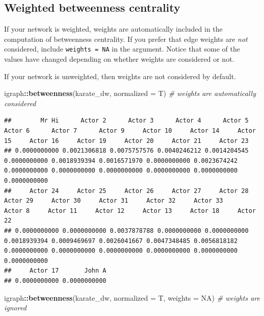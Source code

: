 \documentclass[
]{book}
\newenvironment{Shaded}{\begin{snugshade}}{\end{snugshade}}
\newcommand{\AttributeTok}[1]{\textcolor[rgb]{0.13,0.29,0.53}{#1}}
\newcommand{\CommentTok}[1]{\textcolor[rgb]{0.56,0.35,0.01}{\textit{#1}}}
\newcommand{\ConstantTok}[1]{\textcolor[rgb]{0.56,0.35,0.01}{#1}}
\newcommand{\FunctionTok}[1]{\textcolor[rgb]{0.13,0.29,0.53}{\textbf{#1}}}
\newcommand{\NormalTok}[1]{#1}
\newcommand{\SpecialCharTok}[1]{\textcolor[rgb]{0.81,0.36,0.00}{\textbf{#1}}}
\begin{document}
\subsection{Weighted betweenness centrality}\label{weighted-betweenness-centrality}

If your network is weighted, weights are automatically included in the computation of betweenness centrality. If you prefer that edge weights are \emph{not} considered, include \texttt{weights\ =\ NA} in the argument. Notice that some of the values have changed depending on whether weights are considered or not.

If your network is unweighted, then weights are not considered by default.

\begin{Shaded}
\begin{Highlighting}[]
\NormalTok{igraph}\SpecialCharTok{::}\FunctionTok{betweenness}\NormalTok{(karate\_dw, }\AttributeTok{normalized =}\NormalTok{ T) }\CommentTok{\# weights are automatically considered}
\end{Highlighting}
\end{Shaded}

\begin{verbatim}
##        Mr Hi      Actor 2      Actor 3      Actor 4      Actor 5      Actor 6      Actor 7      Actor 9     Actor 10     Actor 14     Actor 15     Actor 16     Actor 19     Actor 20     Actor 21     Actor 23 
## 0.0000000000 0.0021306818 0.0075757576 0.0040246212 0.0014204545 0.0000000000 0.0018939394 0.0016571970 0.0000000000 0.0023674242 0.0000000000 0.0000000000 0.0000000000 0.0000000000 0.0000000000 0.0000000000 
##     Actor 24     Actor 25     Actor 26     Actor 27     Actor 28     Actor 29     Actor 30     Actor 31     Actor 32     Actor 33      Actor 8     Actor 11     Actor 12     Actor 13     Actor 18     Actor 22 
## 0.0000000000 0.0000000000 0.0037878788 0.0000000000 0.0000000000 0.0018939394 0.0009469697 0.0026041667 0.0047348485 0.0056818182 0.0000000000 0.0000000000 0.0000000000 0.0000000000 0.0000000000 0.0000000000 
##     Actor 17       John A 
## 0.0000000000 0.0000000000
\end{verbatim}

\begin{Shaded}
\begin{Highlighting}[]
\NormalTok{igraph}\SpecialCharTok{::}\FunctionTok{betweenness}\NormalTok{(karate\_dw, }\AttributeTok{normalized =}\NormalTok{ T, }\AttributeTok{weights =} \ConstantTok{NA}\NormalTok{) }\CommentTok{\# weights are ignored}
\end{Highlighting}
\end{Shaded}
\end{document}
